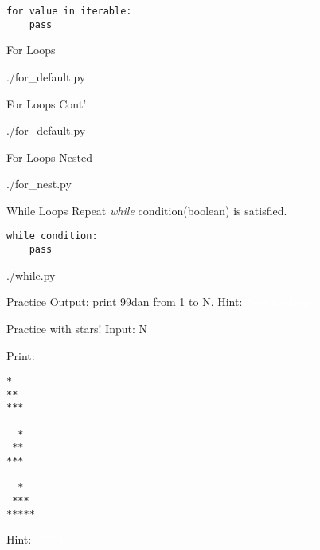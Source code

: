\documentclass{beamer}
\begin{document}
\begin{frame}[fragile]
  \begin{lstlisting}
for value in iterable:
    pass
  \end{lstlisting}
\end{frame}

\begin{frame}{For Loops}
  \begin{lstinputlisting}[firstline=1, lastline=14]
    {./for_default.py}
  \end{lstinputlisting}
\end{frame}

\begin{frame}{For Loops Cont'}
  \begin{lstinputlisting}[firstline=16, lastline=27]
    {./for_default.py}
  \end{lstinputlisting}
\end{frame}

\begin{frame}{For Loops Nested}
  \begin{lstinputlisting}
    {./for_nest.py}
  \end{lstinputlisting}
\end{frame}

\begin{frame}{While Loops}
  Repeat \textit{while} condition(boolean) is satisfied.
\end{frame}

\begin{frame}[fragile]
  \begin{lstlisting}
while condition:
    pass
  \end{lstlisting}
\end{frame}

\begin{frame}[fragile]
  \begin{lstinputlisting}
    {./while.py}
  \end{lstinputlisting}
\end{frame}

\begin{frame}{Practice}
  Output: print 99dan from 1 to N.
  Hint: \textcolor{white}{Nest for loops}
\end{frame}


\begin{frame}[fragile]{Practice with stars!}
  Input: N

  Print:
  \begin{lstlisting}
*
**
***

  *
 **
***

  *
 ***
*****
  \end{lstlisting}
  Hint: \textcolor{white}{'*' * k}
\end{frame}
\end{document}
